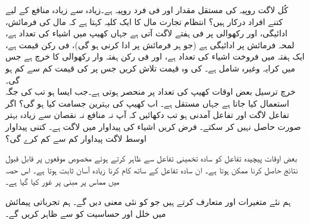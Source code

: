 کُل لاگت   روپیہ کی مستقل مقدار اور فی فرد  روپیہ ہے۔زیادہ سے زیادہ منافع کے لیے کتنے افراد درکار ہیں؟   
انتظام تجارت مال کا ایک کلیہ کہتا ہے کہ مال کی فرمائش، ادائیگی،  اور رکھوالی پر  فی ہفتے  لاگت آتی ہے جہاں  کھیپ میں اشیاء کی تعداد ہے،  لمحہ فرمائش پر ادائیگی ہے (جو ہر فرمائش پر ادا کرنی ہو گی)،  فی رکن قیمت ہے،  ایک ہفتہ میں فروخت اشیاء کی تعداد ہے، اور  فی رکن ہفتہ وار رکھوالی کا خرچ ہے جس میں کرایہ وغیرہ شامل ہے۔  کی وہ قیمت تلاش کریں جس پر   کی قیمت کم سے کم ہو گی۔
\\
خرچ ترسیل بعض اوقات کھیپ کی تعداد پر منحصر ہوتی ہے۔جب ایسا ہو تب  کی جگہ  استعمال کیا جاتا ہے جہاں  مستقل ہے۔ اب کھیپ کی بہترین جسامت کیا ہو گی؟
اگر تفاعل لاگت  اور  تفاعل آمدنی  ہو  تب دکھائیں کہ  آپ نہ  منافع نہ نقصان سے زیادہ بہتر صورت حاصل نہیں  کر سکتے۔  
فرض کریں  اشیاء کی پیداوار  میں لاگت  ہے۔ کتنی پیداوار اوسط لاگت پیداوار کم سے کم کرے گی؟


بعض اوقات پیچیدہ تفاعل کو سادہ تخمینی تفاعل سے  ظاہر کرتے ہوئے مخصوص موقعوں پر قابل قبول نتائج حاصل کرنا ممکن ہوتا ہے۔ ان سادہ تفاعل کے ساتھ کام کرنا زیادہ آسان ثابت ہوتا ہے۔ اس حصہ میں مماس پر مبنی  پر غور کیا گیا ہے۔

ہم نئے متغیرات  اور  متعارف کرتے ہیں جو  کو نئی معنی دیں گے۔  ہم تجرباتی پیمائش میں خلل اور حساسیت  کو  سے ظاہر کریں گے۔


